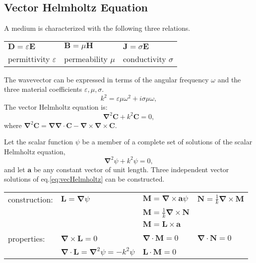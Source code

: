 \documentclass[11pt,letterpaper]{article}
\newcommand{\del}{\boldsymbol\nabla}
\begin{document}
\subsection{Vector Helmholtz Equation}
A medium is characterized with the following three relations.
\begin{center}
\begin{tabular}{lll}
$\mathbf{D}=\varepsilon\mathbf{E}$  & $\mathbf{B}=\mu\mathbf{H}$ 
 & $\mathbf{J}=\sigma\mathbf{E}$ \\ 
permittivity $\varepsilon$ & permeability $\mu$ & conductivity $\sigma$ \\ 
\end{tabular} 
\end{center}
The wavevector can be expressed in terms of the angular frequency $\omega$ and the three material coefficients $\varepsilon, \mu, \sigma$. 
\begin{equation}\label{eq:k}
k^2 = \varepsilon\mu\omega^2+i \sigma \mu\omega,
\end{equation} 
The vector Helmholtz equation is:
\begin{equation}\label{eq:vecHelmholtz}
\del^2 \mathbf{C} + k^2\mathbf{C}=0,
\end{equation}
where $\del^2 \mathbf{C} = \del\del\cdot\mathbf{C}-\del\times\del\times\mathbf{C}$. 

Let the scalar function $\psi$ be a member of a complete set of solutions of the scalar Helmholtz equation,
\begin{equation}\label{eq:scalarHelmholtz}
\del^2 \psi + k^2 \psi = 0,
\end{equation}
and let $\mathbf{a}$ be any constant vector of unit length. Three independent vector solutions of eq.\ref{eq:vecHelmholtz} can be constructed.\\
\begin{center}
\begin{tabular}{ll|l|l}
construction: &$\mathbf{L} = \del \psi $& $\mathbf{M}= \del \times \mathbf{a}\psi $ & $\mathbf{N}= \frac{1}{k} \del \times \mathbf{M}$\\
&& $\mathbf{M}=\frac{1}{k} \del \times \mathbf{N}$ & \\
&& $\mathbf{M}=\mathbf{L}\times\mathbf{a}$ & \\
\hline
&& &\\
properties: &$\del \times \mathbf{L}=0$& $\del\cdot\mathbf{M}=0$ &$\del\cdot\mathbf{N}=0$\\
&$\del\cdot\mathbf{L}= \del ^2 \psi = -k^2 \psi$&$\mathbf{L}\cdot\mathbf{M}=0$&\\ 
\end{tabular}
\end{center}
\end{document}
